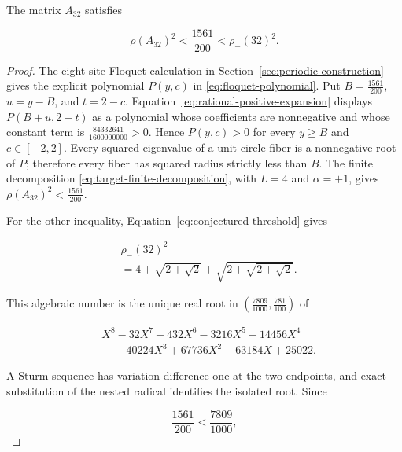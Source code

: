 \begin{proposition}
\label{prop:order-thirty-two-witness}
The matrix \(A_{32}\) satisfies

\begin{equation}
\label{eq:order-thirty-two-certificate}
\rho(A_{32})^{2} < \frac{1561}{200} < \rho_-(32)^{2}.
\end{equation}

\end{proposition}
\begin{proof}
The eight-site Floquet calculation in Section~\ref{sec:periodic-construction} gives the explicit
polynomial \(P(y,c)\) in \eqref{eq:floquet-polynomial}. Put \(B=\frac{1561}{200}\), \(u=y-B\), and \(t=2-c\).
Equation~\eqref{eq:rational-positive-expansion} displays \(P(B+u,2-t)\) as a polynomial whose coefficients are
nonnegative and whose constant term is
\(\frac{84332641}{1600000000}>0\). Hence \(P(y,c)>0\) for every \(y\geq B\) and
\(c \in [-2,2]\). Every squared eigenvalue of a unit-circle fiber is a
nonnegative root of \(P\); therefore every fiber has squared radius strictly
less than \(B\). The finite decomposition \eqref{eq:target-finite-decomposition}, with \(L=4\) and \(\alpha=+1\),
gives \(\rho(A_{32})^{2}<\frac{1561}{200}\).

For the other inequality, Equation~\eqref{eq:conjectured-threshold} gives

\begin{equation}
\label{eq:order-thirty-two-threshold}
\begin{aligned}
&\rho_-(32)^{2} \\
&=4+\sqrt{2+\sqrt{2}}+\sqrt{2+\sqrt{2+\sqrt{2}}}.
\end{aligned}
\end{equation}

This algebraic number is the unique real root in \((\frac{7809}{1000},\frac{781}{100})\) of

\begin{equation}
\label{eq:order-thirty-two-polynomial}
\begin{aligned}
&X^{8}-32X^{7}+432X^{6}-3216X^{5}+14456X^{4} \\
&\quad -40224X^{3}+67736X^{2}-63184X+25022.
\end{aligned}
\end{equation}

A Sturm sequence has variation difference one at the two endpoints, and
exact substitution of the nested radical identifies the isolated root.
Since

\begin{equation}
\frac{1561}{200} < \frac{7809}{1000},
\end{equation}


\end{proof}
